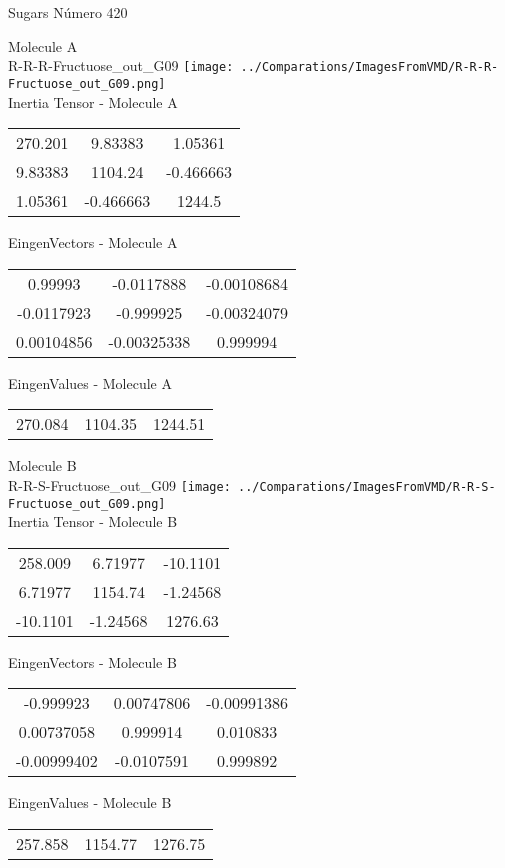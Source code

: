 \vtab[-2cm]
\begin{center}
{\large Sugars \tab Número 420}
\end{center}
\begin{multicols}{2}
\begin{center}

Molecule A \\ 
R-R-R-Fructuose\_out\_G09
\texttt{[image: ../Comparations/ImagesFromVMD/R-R-R-Fructuose\_out\_G09.png]}
\\
Inertia Tensor - Molecule A \\
\vtab

\begin{tabular}{|c c c|}
270.201	 & 	9.83383	 & 	1.05361	 \\
9.83383	 & 	1104.24	 & 	-0.466663	 \\
1.05361	 & 	-0.466663	 & 	1244.5
\end{tabular}

\vtab
 EingenVectors - Molecule A     \\
\vtab
\begin{tabular}{|c c c|}
0.99993	 & 	-0.0117888	 & 	-0.00108684	 \\
-0.0117923	 & 	-0.999925	 & 	-0.00324079	 \\
0.00104856	 & 	-0.00325338	 & 	0.999994
\end{tabular}

\vtab
 EingenValues - Molecule A     \\
\vtab
\begin{tabular}{|c c c|}
270.084	 & 	1104.35	 & 	1244.51	 \\
\end{tabular}
\columnbreak

Molecule B \\ 
R-R-S-Fructuose\_out\_G09
\texttt{[image: ../Comparations/ImagesFromVMD/R-R-S-Fructuose\_out\_G09.png]}
\\
Inertia Tensor - Molecule B \\
\vtab

\begin{tabular}{|c c c|}
258.009	 & 	6.71977	 & 	-10.1101	 \\
6.71977	 & 	1154.74	 & 	-1.24568	 \\
-10.1101	 & 	-1.24568	 & 	1276.63
\end{tabular}

\vtab
 EingenVectors - Molecule B     \\
\vtab
\begin{tabular}{|c c c|}
-0.999923	 & 	0.00747806	 & 	-0.00991386	 \\
0.00737058	 & 	0.999914	 & 	0.010833	 \\
-0.00999402	 & 	-0.0107591	 & 	0.999892
\end{tabular}

\vtab
 EingenValues - Molecule B     \\
\vtab
\begin{tabular}{|c c c|}
257.858	 & 	1154.77	 & 	1276.75	 \\
\end{tabular}

\end{center}
\end{multicols}
